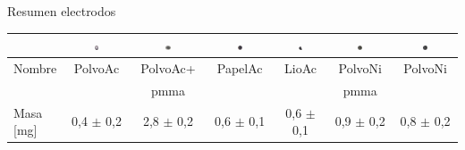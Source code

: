 \documentclass[aspectratio=169]{beamer}
\begin{document}
	\begin{frame}{Resumen electrodos}
		\begin{tabular}{l|c|c|c|c|c|c}
			&
			\includegraphics[width=0.08\textwidth]{electrode_polvo_ac.png} & \includegraphics[width=0.08\textwidth]{electrode_polvo_pmma_ac.png} & \includegraphics[width=0.08\textwidth]{electrode_paper.png} & \includegraphics[width=0.08\textwidth]{electrode_lio.png} & \includegraphics[width=0.08\textwidth]{electrode_polvo_ni.png} & \includegraphics[width=0.08\textwidth]{electrode_polvo_pmma_ni.png} \\
			\hline
			Nombre & PolvoAc & PolvoAc+ & PapelAc & LioAc & PolvoNi & PolvoNi\\
					&		& pmma		&			&				&	pmma\\
			\hline
			Masa [mg] & 0,4 $\pm$ 0,2 & 2,8 $\pm$ 0,2 & 0,6 $\pm$ 0,1 & 0,6 $\pm$ 0,1 & 0,9 $\pm$ 0,2 & 0,8 $\pm$ 0,2
			

		\end{tabular}
	\end{frame}
	
\end{document}
